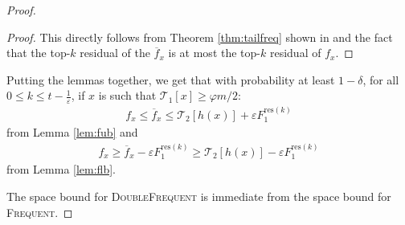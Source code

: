 \documentclass[sigconf,review=true,anonymous=true,screen]{acmart}
\newcommand{\eps}{\varepsilon}
\renewcommand{\phi}{\varphi}
\begin{document}
\begin{proof}
\begin{lemma}
\end{lemma}
\begin{proof}
This directly follows from Theorem \ref{thm:tailfreq} shown in \cite{BCIS} and the fact that the top-$k$ residual of the $\overline{f}_x$ is at most the top-$k$ residual of $f_x$.
\end{proof}
Putting the lemmas together, we get that with probability at least $1-\delta$, for all $0\leq k \leq t-\frac1\eps$, if $x$ is such that $\mathcal{T}_1[x] \geq \phi m/2$:
\begin{align*}
f_x \leq \overline{f}_x \leq \mathcal{T}_2[h(x)] + \eps {F_1^{\text{res}(k)}}
\end{align*}
from Lemma \ref{lem:fub} and
\begin{align*}
f_x \geq \overline{f}_x - {\eps}{} F_1^{\text{res}(k)} \geq \mathcal{T}_2[h(x)] - {\eps}{} F_1^{\text{res}(k)} 
\end{align*}
from Lemma \ref{lem:flb}.

The space bound for \textsc{DoubleFrequent} is immediate from the space bound for \textsc{Frequent}.
\end{proof}
\end{document}
